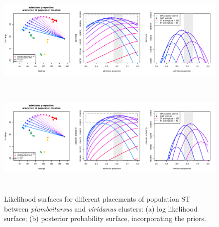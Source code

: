 \documentclass[12pt]{article}
\begin{document}
\begin{figure}
	\centering
			{\includegraphics[width=6in,height=2in]{figs/warblers/admix_prop_func_loc_lnl.pdf}}
			{\includegraphics[width=6in,height=2in]{figs/warblers/admix_prop_func_loc_prob.pdf}}
	\caption{Likelihood surfaces for different placements of population ST between \textit{plumbeitarsus} and \textit{viridanus} clusters: (a) log likelihood surface; (b) posterior probability surface, incorporating the priors.}\label{sfig:admix_prop_func_loc}
\end{figure}
\end{document}
